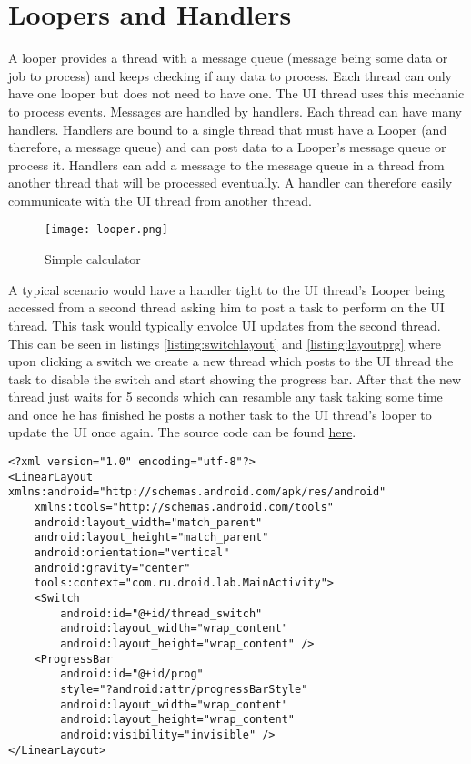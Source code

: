 \section{Loopers and Handlers}
A looper provides a thread with a message queue (message being some data or job to process) and keeps checking if any data to process. Each thread can only have one looper but does not need to have one. The UI thread uses this mechanic to process events. Messages are handled by handlers. Each thread can have many handlers. Handlers are bound to a single thread that must have a Looper (and therefore, a message queue) and can post data to a Looper's message queue or process it. Handlers can add a message to the message queue in a thread from another thread that will be processed eventually. A handler can therefore easily communicate with the UI thread from another thread.

\begin{figure}[H]
\centering
\texttt{[image: looper.png]}
\caption{Simple calculator}
\label{fig:simcal}
\end{figure}

A typical scenario would have a handler tight to the UI thread's Looper being accessed from a second thread asking him to post a task to perform on the UI thread. This task would typically envolce UI updates from the second thread. This can be seen in listings \ref{listing:switchlayout} and \ref{listing:layoutprg} where upon clicking a switch we create a new thread which posts to the UI thread the task to disable the switch and start showing the progress bar. After that the new thread just waits for 5 seconds which can resamble any task taking some time and once he has finished he posts a nother task to the UI thread's looper to update the UI once again. The source code can be found \href{https://github.com/JonSteinn/AndroidDevelopment/tree/master/examples/lab2/handlers}{here}.

\begin{lstlisting}[style=A_XML,caption={Layout for handler program},label={listing:switchlayout}]
<?xml version="1.0" encoding="utf-8"?>
<LinearLayout xmlns:android="http://schemas.android.com/apk/res/android"
    xmlns:tools="http://schemas.android.com/tools"
    android:layout_width="match_parent"
    android:layout_height="match_parent"
    android:orientation="vertical"
    android:gravity="center"
    tools:context="com.ru.droid.lab.MainActivity">
    <Switch
        android:id="@+id/thread_switch"
        android:layout_width="wrap_content"
        android:layout_height="wrap_content" />
    <ProgressBar
        android:id="@+id/prog"
        style="?android:attr/progressBarStyle"
        android:layout_width="wrap_content"
        android:layout_height="wrap_content"
        android:visibility="invisible" />
</LinearLayout>
\end{lstlisting}


